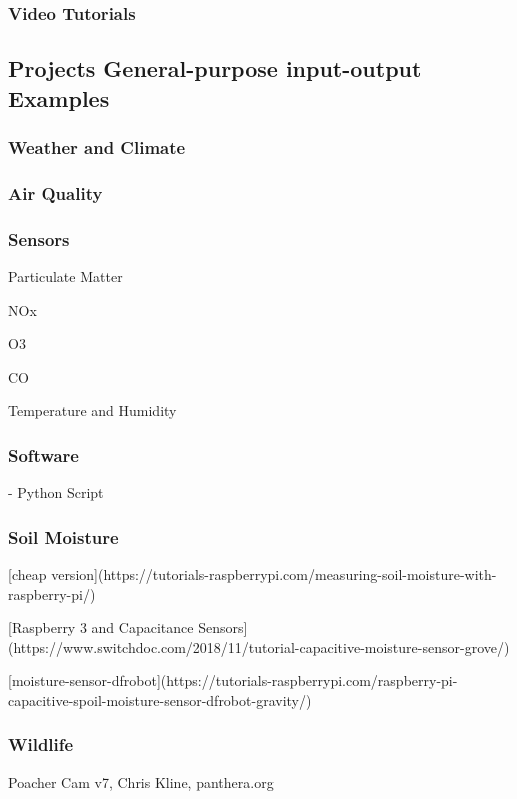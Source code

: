 \documentclass{article}\usepackage[]{graphicx}\usepackage[]{color}
\begin{document}
\subsubsection{Video Tutorials}


\subsection{Projects General-purpose input-output Examples}

\subsubsection{Weather and Climate}


\subsubsection{Air Quality}

\subsubsection{Sensors}

Particulate Matter

NOx

O3

CO

Temperature and Humidity

\subsubsection{Software}

- Python Script

\subsubsection{Soil Moisture}

[cheap version](https://tutorials-raspberrypi.com/measuring-soil-moisture-with-raspberry-pi/)

[Raspberry 3 and Capacitance Sensors](https://www.switchdoc.com/2018/11/tutorial-capacitive-moisture-sensor-grove/)

[moisture-sensor-dfrobot](https://tutorials-raspberrypi.com/raspberry-pi-capacitive-spoil-moisture-sensor-dfrobot-gravity/)


\subsubsection{Wildlife}

Poacher Cam v7, Chris Kline, panthera.org
\end{document}
